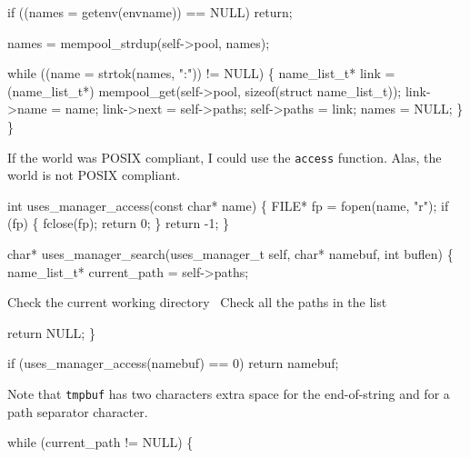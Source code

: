     if ((names = getenv(envname)) == NULL)
        return;

    names = mempool_strdup(self->pool, names);

    while ((name = strtok(names, ":")) != NULL) \{
        name_list_t* link = (name_list_t*)
            mempool_get(self->pool, sizeof(struct name_list_t));
        link->name = name;
        link->next = self->paths;
        self->paths = link;
        names = NULL;
    \}
\}

\nwendcode{}\nwdocspar

If the world was POSIX compliant, I could use the {\tt{}access} function.
Alas, the world is not POSIX compliant.

\nwenddocs{}\plusendmoddef
int uses_manager_access(const char* name)
\{
    FILE* fp = fopen(name, "r");
    if (fp) \{
        fclose(fp);
        return 0;
    \}
    return -1;
\}

\nwendcode{}\nwdocspar

\nwenddocs{}\plusendmoddef
char* uses_manager_search(uses_manager_t self, char* namebuf,
                          int buflen)
\{
    name_list_t* current_path = self->paths;

    \LA{}Check the current working directory~{\nwtagstyle{}}\RA{}
    \LA{}Check all the paths in the list~{\nwtagstyle{}}\RA{}

    return NULL;
\}

\nwendcode{}\nwdocspar

\nwenddocs{}\endmoddef
if (uses_manager_access(namebuf) == 0)
    return namebuf;
\nwendcode{}\nwdocspar

Note that {\tt{}tmpbuf} has two characters extra space for the end-of-string
and for a path separator character.

\nwenddocs{}\endmoddef
while (current_path != NULL) \{

